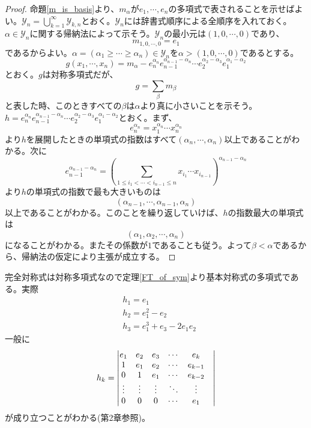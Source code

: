 \documentclass{ltjsreport}
\begin{document}
\begin{proof}
    命題\ref{m_is_basis}より、$m_\alpha$が$e_1,\cdots,e_n$の多項式で表されることを示せばよい。$\mathcal{Y}_n=\bigcup_{k=1}^\infty\mathcal{Y}_{k,n}$とおく。$\mathcal{Y}_n$には辞書式順序による全順序を入れておく。$\alpha\in\mathcal{Y}_n$に関する帰納法によって示そう。$\mathcal{Y}_n$の最小元は$(1,0,\cdots,0)$であり、
    \[
    m_{1,0,\cdots,0}=e_1    
    \]
    であるからよい。$\alpha=(\alpha_1\geq\cdots\geq\alpha_n)\in\mathcal{Y}_n$を$\alpha>(1,0,\cdots,0)$であるとする。
    \[
        g(x_1,\cdots,x_n)=m_\alpha-e_n^{\alpha_n}e_{n-1}^{\alpha_{n-1}-\alpha_n}\cdots e_2^{\alpha_2-\alpha_3}e_1^{\alpha_1-\alpha_2} 
    \]
    とおく。$g$は対称多項式だが、
    \[
    g=\sum_{\beta}m_\beta    
    \]
    と表した時、このときすべての$\beta$は$\alpha$より真に小さいことを示そう。$h=e_n^{\alpha_n}e_{n-1}^{\alpha_{n-1}-\alpha_n}\cdots e_2^{\alpha_2-\alpha_3}e_1^{\alpha_1-\alpha_2}$とおく。まず、
    \[
    e_n^{\alpha_n}=x_1^{\alpha_n}\cdots x_n^{\alpha_n}    
    \]
    より$h$を展開したときの単項式の指数はすべて$(\alpha_n,\cdots,\alpha_n)$以上であることがわかる。次に
    \[
    e_{n-1}^{\alpha_{n-1}-\alpha_n}=\left(\sum_{1\leq i_1<\cdots<i_{n-1}\leq n}x_{i_1}\cdots x_{i_{n-1}}\right)^{\alpha_{n-1}-\alpha_n}
    \]
    より$h$の単項式の指数で最も大きいものは
    \[
    (\alpha_{n-1},\cdots,\alpha_{n-1},\alpha_n)    
    \]
    以上であることがわかる。このことを繰り返していけば、$h$の指数最大の単項式は
    \[
    (\alpha_1,\alpha_2,\cdots,\alpha_n)    
    \]
    になることがわかる。またその係数が$1$であることも従う。よって$\beta <\alpha$であるから、帰納法の仮定により主張が成立する。
\end{proof}

\begin{eg}
    完全対称式は対称多項式なので定理\ref{FT_of_sym}より基本対称式の多項式である。実際
    \begin{align*}
        &h_1=e_1\\
        &h_2=e_1^2-e_2\\
        &h_3=e_1^3+e_3-2e_1e_2
    \end{align*}
    一般に
    \[
    h_k=\begin{vmatrix} e_1&e_2&e_3&\cdots&e_k\\
              1&e_1&e_2&\cdots&e_{k-1}\\
              0&1&e_1&\cdots&e_{k-2}\\
              \vdots&\vdots&\vdots&\ddots&\vdots&\\
              0&0&0&\cdots&e_1 \end{vmatrix}
    \]
    が成り立つことがわかる(第2章参照)。
\end{eg}
\end{document}
